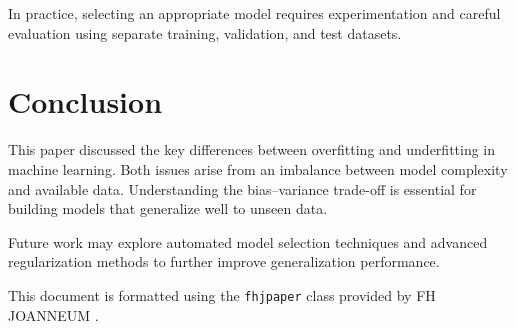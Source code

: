 \documentclass{article}
\begin{document}
In practice, selecting an appropriate model requires experimentation and careful
evaluation using separate training, validation, and test datasets.

\section{Conclusion}
\label{sec:conclusion}

This paper discussed the key differences between overfitting and underfitting in
machine learning. Both issues arise from an imbalance between model complexity and
available data. Understanding the bias--variance trade-off is essential for
building models that generalize well to unseen data.

Future work may explore automated model selection techniques and advanced
regularization methods to further improve generalization performance.

This document is formatted using the \texttt{fhjpaper} class provided by FH JOANNEUM
\citep{fhj-script}.

\printbibliography
\end{document}
